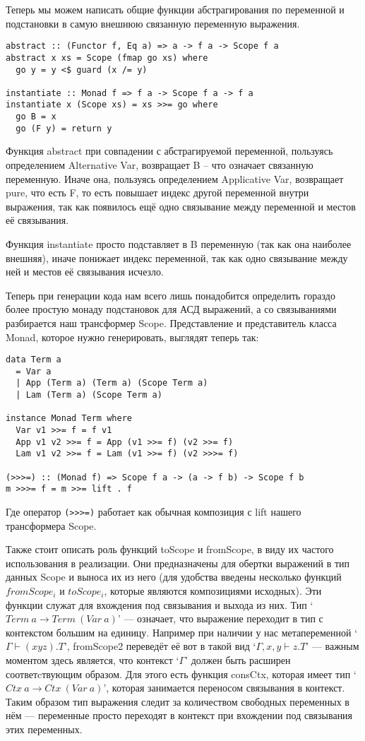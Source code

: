 Теперь мы можем написать общие функции абстрагирования по переменной и подстановки в самую внешнюю связанную переменную выражения.
\begin{lstlisting}[frame=single]
abstract :: (Functor f, Eq a) => a -> f a -> Scope f a
abstract x xs = Scope (fmap go xs) where
  go y = y <$ guard (x /= y)

instantiate :: Monad f => f a -> Scope f a -> f a
instantiate x (Scope xs) = xs >>= go where
  go B = x
  go (F y) = return y
\end{lstlisting}

Функция abstract при совпадении с абстрагируемой переменной, пользуясь определением Alternative Var, возвращает B -- что означает связанную переменную. Иначе она, пользуясь определением Applicative Var, возвращает pure, что есть F, то есть повышает индекс другой переменной внутри выражения, так как появилось ещё одно связывание между переменной и местов её связывания.

Функция instantiate просто подставляет в B переменную (так как она наиболее внешняя), иначе понижает индекс переменной, так как одно связывание между ней и местов её связывания исчезло.

Теперь при генерации кода нам всего лишь понадобится определить гораздо более простую монаду подстановок для АСД выражений, а со связываниями разбирается наш трансформер Scope. Представление и представитель класса Monad, которое нужно генерировать, выглядят теперь так:

\begin{lstlisting}[frame=single]
data Term a
  = Var a
  | App (Term a) (Term a) (Scope Term a)
  | Lam (Term a) (Scope Term a)

instance Monad Term where
  Var v1 >>= f = f v1
  App v1 v2 >>= f = App (v1 >>= f) (v2 >>= f)
  Lam v1 v2 >>= f = Lam (v1 >>= f) (v2 >>>= f)

(>>>=) :: (Monad f) => Scope f a -> (a -> f b) -> Scope f b
m >>>= f = m >>= lift . f
\end{lstlisting}

Где оператор \lstinline{(>>>=)} работает как обычная композиция с lift нашего трансформера Scope.

Также стоит описать роль функций toScope и fromScope, в виду их частого использования в реализации. Они предназначены для обертки выражений в тип данных Scope и выноса их из него (для удобства введены несколько функций $fromScope_i$ и $toScope_i$, которые являются композициями исходных). Эти функции служат для вхождения под связывания и выхода из них. Тип `$Term\ a \rightarrow Term\ (Var\ a)$' --- означает, что выражение переходит в тип с контекстом большим на единицу. Например при наличии у нас метапеременной `$\Gamma \vdash (x y z).T$', fromScope2 переведёт её вот в такой вид `$\Gamma, x, y \vdash z.T$' --- важным моментом здесь является, что контекст `$\Gamma$' должен быть расширен соответcтвующим образом. Для этого есть функция consCtx, которая имеет тип `$Ctx\ a \rightarrow Ctx\ (Var\ a)$', которая занимается переносом связывания в контекст. Таким образом тип выражения следит за количеством свободных переменных в нём --- переменные просто переходят в контекст при вхождении под связывания этих переменных.

